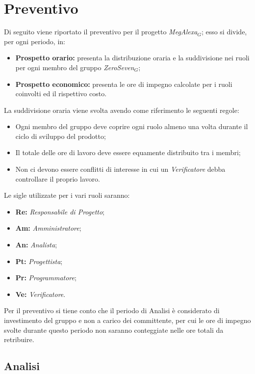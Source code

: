 \chapter{Preventivo}\label{Prev}
\begin{flushleft}
Di seguito viene riportato il preventivo per il progetto \textit{MegAlexa$_{G}$}; esso si divide, per ogni periodo, in:
\begin{itemize}
	\item \textbf{Prospetto orario:} presenta la distribuzione oraria e la suddivisione nei ruoli per ogni membro del gruppo \textit{ZeroSeven$_{G}$};
	\item \textbf{Prospetto economico:} presenta le ore di impegno calcolate per i ruoli coinvolti ed il rispettivo costo.
\end{itemize}
La suddivisione oraria viene svolta avendo come riferimento le seguenti regole:
\begin{itemize}
	\item Ogni membro del gruppo deve coprire ogni ruolo almeno una volta durante il ciclo di sviluppo del prodotto;
	\item Il totale delle ore di lavoro deve essere equamente distribuito tra i membri;
	\item Non ci devono essere conflitti di interesse in cui un \textit{Verificatore} debba controllare il proprio lavoro.
\end{itemize}
Le sigle utilizzate per i vari ruoli saranno:
\begin{itemize}
	\item \textbf{Re:} \textit{Responsabile di Progetto};
	\item \textbf{Am:} \textit{Amministratore};
	\item \textbf{An:} \textit{Analista};
	\item \textbf{Pt:} \textit{Progettista};
	\item \textbf{Pr:} \textit{Programmatore};
	\item \textbf{Ve:} \textit{Verificatore}.
\end{itemize}
Per il preventivo si tiene conto che il periodo di Analisi è considerato di investimento del gruppo e non a carico dei committente, per cui le ore di impegno svolte durante questo periodo non saranno conteggiate nelle ore totali da retribuire.
\end{flushleft}
\newpage
\section{Analisi }
